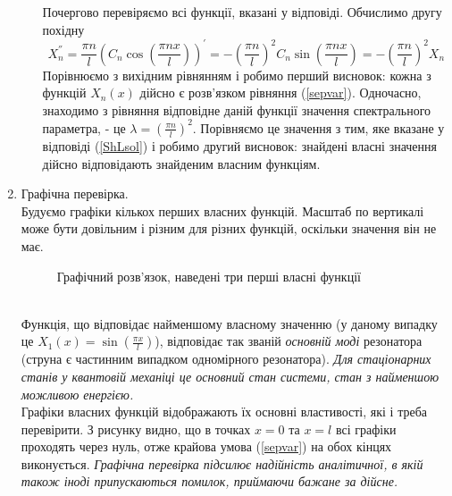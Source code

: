 \begin{enumerate}[wide, labelindent=0pt]
\begin{enumerate}
        Почергово перевіряємо всі функції, вказані у відповіді. Обчислимо другу похідну  
        \begin{equation*}
            X_n^{''} = \frac{\pi n}{l} \left(C_n\cos\left(\frac{\pi n x}{l}\right)\right)^{'} = -\left(\frac{\pi n}{l}\right)^2 C_n\sin\left(\frac{\pi n x}{l}\right) = -\left(\frac{\pi n}{l}\right)^2 X_n
        \end{equation*}
        Порівнюємо з вихідним рівнянням і робимо перший висновок: кожна з функцій $X_n(x)$ дійсно є розв’язком рівняння (\ref{sepvar}). Одночасно, знаходимо з рівняння відповідне даній функції значення спектрального параметра, - це $\lambda = \left(\frac{\pi n}{l}\right)^2$. Порівняємо це значення з тим, яке вказане у відповіді (\ref{ShLsol}) і робимо другий висновок: знайдені власні значення дійсно відповідають знайденим власним функціям.
    \end{enumerate}
    \item Графічна перевірка.\\
    Будуємо графіки кількох перших власних функцій. Масштаб по вертикалі може бути довільним і різним для різних функцій, оскільки значення він не має.
    \begin{figure}[h]
        \centering
    \caption{Графічний розв'язок, наведені три перші власні функції}
    \end{figure}\\
    Функція, що відповідає найменшому власному значенню (у даному випадку це $X_1(x) = \sin\left(\frac{\pi x}{l}\right)$), відповідає так званій \textit{основній моді} резонатора (струна є частинним випадком одномірного резонатора). \textit{Для стаціонарних станів у квантовій механіці це основний стан системи, стан з найменшою можливою енергією.}\\
    Графіки власних функцій відображають їх основні властивості, які і треба перевірити. З рисунку видно, що в точках $x = 0$ та $x = l$ всі графіки проходять через нуль, отже крайова умова (\ref{sepvar}) на обох кінцях виконується. \textit{Графічна перевірка підсилює надійність аналітичної, в якій також іноді припускаються помилок, приймаючи бажане за дійсне.}
\end{enumerate}

